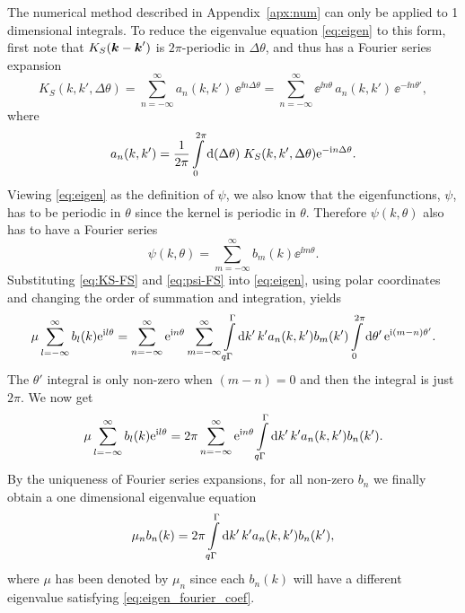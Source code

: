 \documentclass[11pt,a4paper, 
swedish,english %
]{article}
\begin{document}
The numerical method described in Appendix~\ref{apx:num} can only be
applied to 1 dimensional integrals.
To reduce the eigenvalue equation \eqref{eq:eigen} to this form, first
note that $K_S(\vb*k-\vb*k')$ is $2\pi$-periodic in $\Delta\theta$,
and thus has a Fourier series expansion  
\begin{equation} \label{eq:KS-FS}
K_S(k, k', \Delta\theta)  
=\sum_{n=-\infty}^\infty a_{n}(k, k')\, \ee^{\ii n\Delta\theta}
=\sum_{n=-\infty}^\infty \ee^{\ii n\theta}\,a_{n}(k, k')\,\ee^{-\ii n\theta'},
\end{equation}
where 
\begin{equation} \label{eq:KS-FS-coef}
a_{n}(k, k') = \frac{1}{2\pi} \int_0^{2\pi} \rd(\Delta\theta)\; 
K_S(k, k', \Delta\theta)\ee^{-\ii n\Delta\theta}.
\end{equation}
Viewing \eqref{eq:eigen} as the definition of $\psi$, we also know
that the eigenfunctions, $\psi$, has to be periodic in 
$\theta$ since the kernel is periodic in $\theta$. Therefore
$\psi(k, \theta)$ also has to have a Fourier series 
\begin{equation}\label{eq:psi-FS}
\psi(k, \theta) = \sum_{m=-\infty}^\infty b_m(k)\ee^{\ii m\theta}.
\end{equation}
Substituting \eqref{eq:KS-FS} and \eqref{eq:psi-FS} into
\eqref{eq:eigen}, using polar coordinates and changing the order of
summation and integration, yields
\begin{equation}
\mu\sum_{l=-\infty}^\infty b_l(k)\ee^{\ii l\theta}
= \sum_{n=-\infty}^\infty \ee^{\ii n\theta} \sum_{m=-\infty}^\infty 
\int_{q\Gamma}^\Gamma\rd{k'}\,k' a_n(k, k') b_m(k')
\int_{0}^{2\pi}\rd\theta'\,
\ee^{\ii (m-n)\theta'}.
\end{equation}
The $\theta'$ integral is only non-zero when $(m-n)=0$ and
then the integral is just $2\pi$. We now get
\begin{equation}
\mu\sum_{l=-\infty}^\infty b_l(k)\ee^{\ii l\theta}
= 2\pi\sum_{n=-\infty}^\infty \ee^{\ii n\theta} 
\int_{q\Gamma}^\Gamma\rd{k'}\,k' a_n(k, k') b_n(k').
\end{equation}
By the uniqueness of Fourier series expansions, for all non-zero $b_n$
we finally obtain a one dimensional eigenvalue equation
\begin{equation}
\label{eq:eigen_fourier_coef}
\mu_n b_n(k) = 2\pi\int_{q\Gamma}^\Gamma\rd{k'}\,k' a_n(k, k') b_n(k'),
\end{equation}
where $\mu$ has been denoted by $\mu_n$ since each $b_n(k)$
will have a different eigenvalue satisfying
\eqref{eq:eigen_fourier_coef}.  
\end{document}
